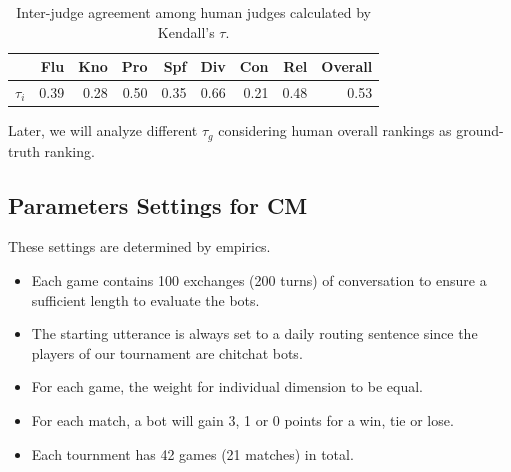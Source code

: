 \begin{table}[ht!]
\centering
\scriptsize
\begin{tabular}{lrrrrrrrr}
\toprule
& Flu& Kno& Pro& Spf& Div& Con & Rel & Overall \\ \midrule
$\tau_i$ & 0.39 &0.28 &0.50 &0.35 &0.66 &0.21 &0.48 & 0.53  \\
\bottomrule
\end{tabular}
\caption{Inter-judge agreement among human judges calculated by Kendall's $\tau$.}
\label{tab:inter}
\end{table}
 
Later, we will analyze different $\tau_g$ 
considering human overall rankings as ground-truth ranking.  


\subsection{Parameters Settings for CM}
These settings are determined by empirics.
\begin{itemize}
\item  Each game contains 100 exchanges (200 turns) of conversation
to ensure a sufficient length to evaluate the bots.
\item  The starting utterance is always set to
a daily routing sentence
since the players of our tournament are chitchat bots.
\item For each game, the weight for individual dimension to be equal. 
\item For each match, a bot will gain 3, 1 or 0 points for a win, tie or lose.
\item Each tournment has 42 games (21 matches) 
in total. 
\end{itemize}


